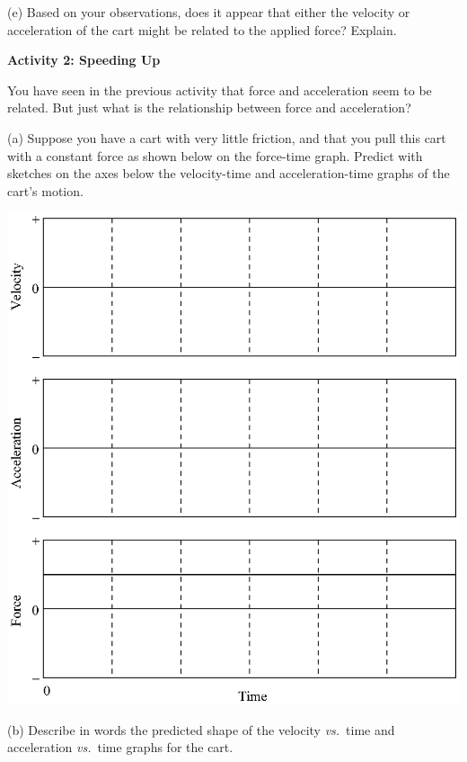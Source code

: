 (e) Based on your observations, does it appear that either the velocity or acceleration
of the cart might be related to the applied force? Explain.
\answerspace{15mm}

\pagebreak[3]
\textbf{Activity 2: Speeding Up }

You have seen in the previous activity that force and acceleration seem to be
related. But just what is the relationship between force and acceleration? 

(a) Suppose you have a cart with very little friction, and that you pull this
cart with a constant force as shown below on the force-time graph. Predict with sketches on
the axes below the velocity-time and acceleration-time graphs of the cart's motion.

\vspace{0.3cm}
{\par\centering \includegraphics{force1/force1_fig3.eps} \par}
\vspace{0.3cm}

(b) Describe in words the predicted shape of the velocity \textit{vs.}~time and acceleration
\textit{vs.}~time graphs for the cart.
\vspace{20mm}

